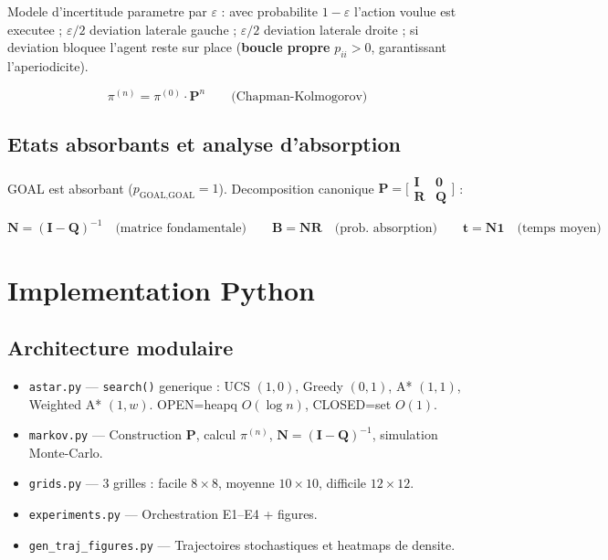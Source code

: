 \documentclass[11pt,a4paper]{article}
\begin{document}
Modele d'incertitude parametre par $\varepsilon$ : avec probabilite $1{-}\varepsilon$ l'action
voulue est executee ; $\varepsilon/2$ deviation laterale gauche ; $\varepsilon/2$ deviation
laterale droite ; si deviation bloquee l'agent reste sur place (\textbf{boucle propre} $p_{ii}>0$,
garantissant l'aperiodicite).
\begin{formulebox}
\[ \pi^{(n)}=\pi^{(0)}\cdot\mathbf{P}^n \qquad \text{(Chapman-Kolmogorov)} \]
\end{formulebox}

\subsection{Etats absorbants et analyse d'absorption}

GOAL est absorbant ($p_{\text{GOAL,GOAL}}=1$). Decomposition canonique $\mathbf{P}=\bigl[\begin{smallmatrix}\mathbf{I}&\mathbf{0}\\\mathbf{R}&\mathbf{Q}\end{smallmatrix}\bigr]$ :
\begin{formulebox}
\[ \mathbf{N}=(\mathbf{I}-\mathbf{Q})^{-1}\quad\text{(matrice fondamentale)}\qquad \mathbf{B}=\mathbf{N}\mathbf{R}\quad\text{(prob. absorption)}\qquad \mathbf{t}=\mathbf{N}\mathbf{1}\quad\text{(temps moyen)} \]
\end{formulebox}

\section{Implementation Python}

\subsection{Architecture modulaire}
\begin{itemize}[leftmargin=1.4cm,itemsep=2pt]
  \item \texttt{astar.py} --- \texttt{search()} generique : UCS $(1,0)$, Greedy $(0,1)$, A* $(1,1)$, Weighted A* $(1,w)$. OPEN=heapq $O(\log n)$, CLOSED=set $O(1)$.
  \item \texttt{markov.py} --- Construction $\mathbf{P}$, calcul $\pi^{(n)}$, $\mathbf{N}=(\mathbf{I}-\mathbf{Q})^{-1}$, simulation Monte-Carlo.
  \item \texttt{grids.py} --- 3 grilles : facile $8\times8$, moyenne $10\times10$, difficile $12\times12$.
  \item \texttt{experiments.py} --- Orchestration E1--E4 + figures.
  \item \texttt{gen\_traj\_figures.py} --- Trajectoires stochastiques et heatmaps de densite.
\end{itemize}
\end{document}
